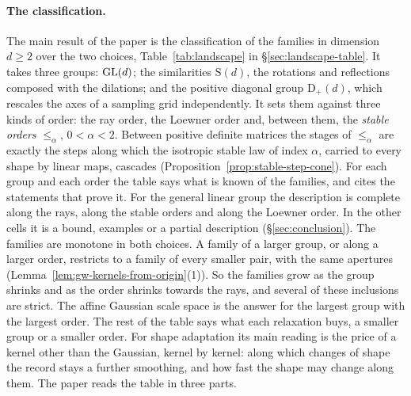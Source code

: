 \paragraph{The classification.} The main result of the paper is the classification of the families
in dimension $d \ge 2$ over the two choices, Table~\ref{tab:landscape} in \S\ref{sec:landscape-table}. It takes three
groups: $\mathrm{GL}(d)$; the similarities $\mathrm S(d)$, the rotations and reflections composed with the
dilations; and the positive diagonal group $\mathrm D_+(d)$, which rescales the axes of a sampling
grid independently. It sets them against three kinds of order: the ray order, the Loewner order and,
between them, the \emph{stable orders} $\le_\alpha$, $0 < \alpha < 2$. Between positive definite
matrices the stages of $\le_\alpha$ are exactly the steps along which the isotropic stable law of index $\alpha$, carried to every shape by
linear maps, cascades (Proposition~\ref{prop:stable-step-cone}). For each group and each order the
table says what is known of the families, and cites the statements that prove it.
For the general linear group the description is complete along the rays, along the stable orders and
along the Loewner order. In the other cells it is a bound, examples or a partial description
(\S\ref{sec:conclusion}). The families are monotone
in both choices. A family of a larger group, or along a larger order, restricts to a family of every
smaller pair, with the same apertures (Lemma~\ref{lem:gw-kernels-from-origin}(1)). So the families
grow as the group shrinks and as the order shrinks towards the rays, and several of these inclusions
are strict. The affine Gaussian scale space is the answer for the largest group with the largest
order. The rest of the table says what each relaxation buys, a smaller group or a smaller order. For
shape adaptation its main reading is the price of a kernel other than the Gaussian, kernel by kernel:
along which changes of shape the record stays a further smoothing, and how fast the shape may change
along them. The paper reads the table in three parts.

